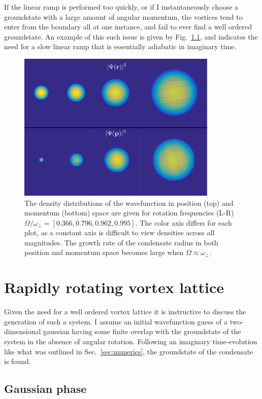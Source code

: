 {If the linear ramp is performed too quickly, or if I instantaneously choose a groundstate with a large amount of angular momentum, the vortices tend to enter from the boundary all at one instance, and fail to ever find a well ordered groundstate. An example of this such issue is given by Fig.~\ref{}, and indicates the need for a slow linear ramp that is essentially adiabatic in imaginary time.

\begin{figure}
    \includegraphics[width=0.85\textwidth]{Images/ch4_vtx/ramp_omega.pdf}
    \caption{The density distributions of the wavefunction in position (top) and momentum (bottom) space are given for rotation frequencies (L-R) $\Omega/\omega_\perp=[0.366,0.796,0.962,0.995]$. The color axis differs for each plot, as a constant axis is difficult to view densities across all magnitudes. The growth rate of the condensate radius in both position and momentum space becomes large when $\Omega \approx \omega_\perp$.}
    \label{fig:malformed_lattice}
\end{figure}

\section{Rapidly rotating vortex lattice}
Given the need for a well ordered vortex lattice it is instructive to discuss the generation of such a system. I assume an initial wavefunction guess of a two-dimensional gaussian having some finite overlap with the groundstate of the system in the absence of angular rotation. Following an imaginary time-evolution like what was outlined in Sec.~\ref{sec:numerics}, the groundstate of the condensate is found.


\subsection{Gaussian phase}

}
